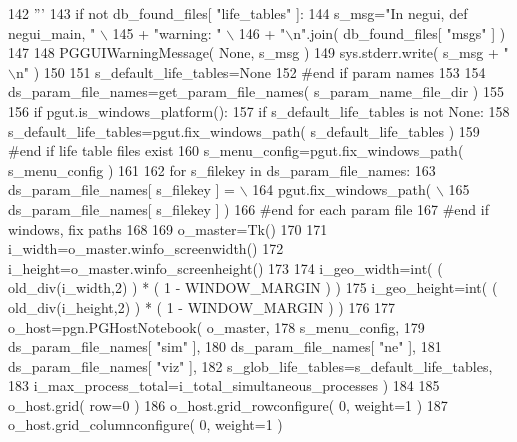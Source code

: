 \begin{DoxyCode}
142 \textcolor{stringliteral}{    '''}
143     \textcolor{keywordflow}{if} \textcolor{keywordflow}{not} db\_found\_files[ \textcolor{stringliteral}{"life\_tables"} ]:
144         s\_msg=\textcolor{stringliteral}{"In negui, def negui\_main, "} \(\backslash\)
145                         + \textcolor{stringliteral}{"warning: "} \(\backslash\)
146                         + \textcolor{stringliteral}{"\(\backslash\)n"}.join( db\_found\_files[ \textcolor{stringliteral}{"msgs"} ]  )
147 
148         PGGUIWarningMessage( \textcolor{keywordtype}{None}, s\_msg )
149         sys.stderr.write( s\_msg + \textcolor{stringliteral}{"\(\backslash\)n"} )
150 
151         s\_default\_life\_tables=\textcolor{keywordtype}{None}
152     \textcolor{comment}{#end if param names}
153 
154     ds\_param\_file\_names=get\_param\_file\_names( s\_param\_name\_file\_dir )
155 
156     \textcolor{keywordflow}{if} pgut.is\_windows\_platform():
157         \textcolor{keywordflow}{if} s\_default\_life\_tables \textcolor{keywordflow}{is} \textcolor{keywordflow}{not} \textcolor{keywordtype}{None}:
158             s\_default\_life\_tables=pgut.fix\_windows\_path( s\_default\_life\_tables )
159         \textcolor{comment}{#end if life table files exist}
160         s\_menu\_config=pgut.fix\_windows\_path( s\_menu\_config )
161 
162         \textcolor{keywordflow}{for} s\_filekey \textcolor{keywordflow}{in} ds\_param\_file\_names:
163             ds\_param\_file\_names[ s\_filekey ] = \(\backslash\)
164                     pgut.fix\_windows\_path( \(\backslash\)
165                             ds\_param\_file\_names[ s\_filekey ] )
166         \textcolor{comment}{#end for each param file}
167     \textcolor{comment}{#end if windows, fix paths}
168 
169     o\_master=Tk()
170 
171     i\_width=o\_master.winfo\_screenwidth()
172     i\_height=o\_master.winfo\_screenheight()
173 
174     i\_geo\_width=int( ( old\_div(i\_width,2) ) * ( 1 - WINDOW\_MARGIN ) )
175     i\_geo\_height=int( ( old\_div(i\_height,2) ) * ( 1 - WINDOW\_MARGIN ) )
176 
177     o\_host=pgn.PGHostNotebook( o\_master, 
178             s\_menu\_config, 
179             ds\_param\_file\_names[ \textcolor{stringliteral}{"sim"} ], 
180             ds\_param\_file\_names[ \textcolor{stringliteral}{"ne"} ], 
181             ds\_param\_file\_names[ \textcolor{stringliteral}{"viz"} ], 
182             s\_glob\_life\_tables=s\_default\_life\_tables,
183             i\_max\_process\_total=i\_total\_simultaneous\_processes )
184 
185     o\_host.grid( row=0 )
186     o\_host.grid\_rowconfigure( 0, weight=1 )
187     o\_host.grid\_columnconfigure( 0, weight=1 )

\end{DoxyCode}
